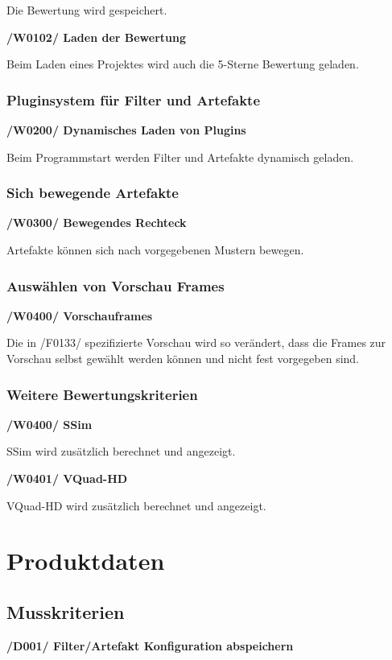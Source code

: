 \documentclass[parskip=full]{scrartcl}
\begin{document}
Die Bewertung wird gespeichert.

\textbf{/W0102/ Laden der Bewertung}

Beim Laden eines Projektes wird auch die 5-Sterne Bewertung geladen.


\subsubsection{Pluginsystem für Filter und Artefakte}

\textbf{/W0200/ Dynamisches Laden von Plugins}

Beim Programmstart werden Filter und Artefakte dynamisch geladen.

\subsubsection{Sich bewegende Artefakte}

\textbf{/W0300/ Bewegendes Rechteck}

Artefakte können sich nach vorgegebenen Mustern bewegen.

\subsubsection{Auswählen von Vorschau Frames}

\textbf{/W0400/ Vorschauframes}

Die in /F0133/ spezifizierte Vorschau wird so verändert, dass die Frames zur Vorschau selbst gewählt werden können und nicht fest vorgegeben sind.

\subsubsection{Weitere Bewertungskriterien}

\textbf{/W0400/ SSim}

SSim wird zusätzlich berechnet und angezeigt.

\textbf{/W0401/ VQuad-HD}

VQuad-HD wird zusätzlich berechnet und angezeigt.


\newpage
\section{Produktdaten}
\subsection{Musskriterien}
\textbf{/D001/ Filter/Artefakt Konfiguration abspeichern}
\end{document}
